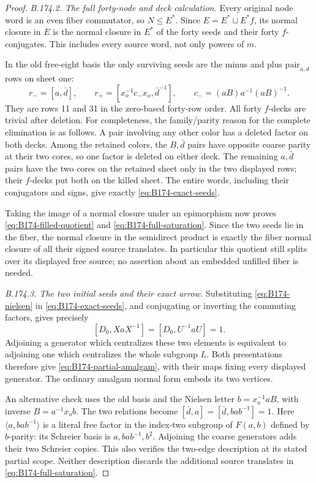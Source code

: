 \begin{proof}
\emph{B.174.2. The full forty-node and deck calculation.}
Every original node word is an even fiber commutator, so \(N\le E^*\).
Since \(E=E^*\sqcup E^*f\), its normal closure in \(E\) is the
normal closure in \(E^*\) of the forty seeds and their forty
\(f\)-conjugates. This includes every source word, not only powers
of \(m\).

In the old free-eight basis the only surviving seeds are
the minus and plus \(\mathrm{pair}_{\bar a,d}\) rows on sheet one:
\begin{equation}\label{eq:B174-exact-seeds}
 r_-=[a,\bar d],\qquad
 r_+=[x_o^{-1}c_-x_o,\bar d^{-1}],\qquad
 c_-=(aB)a^{-1}(aB)^{-1}.
\end{equation}
They are rows 11 and 31 in the zero-based forty-row order.
All forty \(f\)-decks are trivial after deletion.
For completeness, the family/parity reason for the complete
elimination is as follows. A pair involving any other color has a
deleted factor on both decks. Among the retained colors, the
\(B,\bar d\) pairs have opposite coarse parity at their two cores,
so one factor is deleted on either deck. The remaining
\(a,\bar d\) pairs have the two cores on the retained sheet only
in the two displayed rows; their \(f\)-decks put both on the killed
sheet. The entire words, including their conjugators and signs,
give exactly \eqref{eq:B174-exact-seeds}.

Taking the image of a normal closure under an epimorphism now proves
\eqref{eq:B174-filled-quotient} and
\eqref{eq:B174-full-saturation}. Since the two seeds lie in the
fiber, the normal closure in the semidirect product is exactly the
fiber normal closure of all their signed source translates. In
particular this quotient still splits over its displayed free source;
no assertion about an embedded unfilled fiber is needed.

\emph{B.174.3. The two initial seeds and their exact arrow.}
Substituting \eqref{eq:B174-nielsen} in
\eqref{eq:B174-exact-seeds}, and conjugating or inverting the
commuting factors, gives precisely
\[
 [D_0,XaX^{-1}]=[D_0,U^{-1}aU]=1.
 \tag{B.174.3}
\]
Adjoining a generator which centralizes these two elements is
equivalent to adjoining one which centralizes the whole subgroup
\(L\). Both presentations therefore give
\eqref{eq:B174-partial-amalgam}, with their maps fixing every
displayed generator. The ordinary amalgam normal form embeds its
two vertices.

An alternative check uses the old basis and the Nielsen letter
\(b=x_o^{-1}aB\), with inverse \(B=a^{-1}x_ob\).
The two relations become
\([\bar d,a]=[\bar d,bab^{-1}]=1\).
Here \(\langle a,bab^{-1}\rangle\) is a literal free factor in
the index-two subgroup of \(F(a,b)\) defined by \(b\)-parity:
its Schreier basis is \(a,bab^{-1},b^2\).
Adjoining the coarse generators adds their two Schreier copies.
This also verifies the two-edge description at its stated partial
scope. Neither description discards the additional source translates
in \eqref{eq:B174-full-saturation}.


\end{proof}
